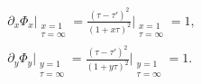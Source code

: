 \documentclass[11pt]{article}
\begin{document}
\begin{subequations}\begin{align}
    \partial_x \Phi_x \Bigg\vert_{\substack{x=1 \\ \tau=\infty}} = 
    \frac{(\tau-\tau')^2}{(1+x\tau)^2} \Bigg\vert_{\substack{x=1 \\ \tau=\infty}} = 1, \\
    \partial_y \Phi_y \Bigg\vert_{\substack{y=1 \\ \tau=\infty}} =
    \frac{(\tau-\tau')^2}{(1+y\tau)^2} \Bigg\vert_{\substack{y=1 \\ \tau=\infty}} = 1.
\end{align}\end{subequations}


\end{document}
